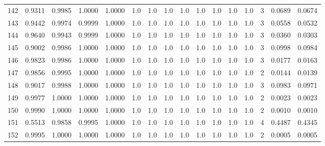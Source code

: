 \begin{tabular}{lrrrrrrrrrrrrrrr}
142 &      0.9311 &  0.9985 &  1.0000 &  1.0000 &     1.0 &     1.0 &     1.0 &     1.0 &     1.0 &     1.0 &      1.0 &        1.0 &      3 &                    0.0689 &                     0.0674 \\
143 &      0.9442 &  0.9974 &  0.9999 &  1.0000 &     1.0 &     1.0 &     1.0 &     1.0 &     1.0 &     1.0 &      1.0 &        1.0 &      3 &                    0.0558 &                     0.0532 \\
144 &      0.9640 &  0.9943 &  0.9999 &  1.0000 &     1.0 &     1.0 &     1.0 &     1.0 &     1.0 &     1.0 &      1.0 &        1.0 &      3 &                    0.0360 &                     0.0303 \\
145 &      0.9002 &  0.9986 &  1.0000 &  1.0000 &     1.0 &     1.0 &     1.0 &     1.0 &     1.0 &     1.0 &      1.0 &        1.0 &      3 &                    0.0998 &                     0.0984 \\
146 &      0.9823 &  0.9986 &  1.0000 &  1.0000 &     1.0 &     1.0 &     1.0 &     1.0 &     1.0 &     1.0 &      1.0 &        1.0 &      3 &                    0.0177 &                     0.0163 \\
147 &      0.9856 &  0.9995 &  1.0000 &  1.0000 &     1.0 &     1.0 &     1.0 &     1.0 &     1.0 &     1.0 &      1.0 &        1.0 &      2 &                    0.0144 &                     0.0139 \\
148 &      0.9017 &  0.9988 &  1.0000 &  1.0000 &     1.0 &     1.0 &     1.0 &     1.0 &     1.0 &     1.0 &      1.0 &        1.0 &      3 &                    0.0983 &                     0.0971 \\
149 &      0.9977 &  1.0000 &  1.0000 &  1.0000 &     1.0 &     1.0 &     1.0 &     1.0 &     1.0 &     1.0 &      1.0 &        1.0 &      2 &                    0.0023 &                     0.0023 \\
150 &      0.9990 &  1.0000 &  1.0000 &  1.0000 &     1.0 &     1.0 &     1.0 &     1.0 &     1.0 &     1.0 &      1.0 &        1.0 &      2 &                    0.0010 &                     0.0010 \\
151 &      0.5513 &  0.9858 &  0.9995 &  1.0000 &     1.0 &     1.0 &     1.0 &     1.0 &     1.0 &     1.0 &      1.0 &        1.0 &      4 &                    0.4487 &                     0.4345 \\
152 &      0.9995 &  1.0000 &  1.0000 &  1.0000 &     1.0 &     1.0 &     1.0 &     1.0 &     1.0 &     1.0 &      1.0 &        1.0 &      2 &                    0.0005 &                     0.0005 \\

\end{tabular}
